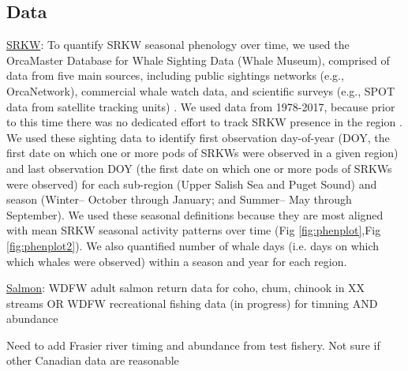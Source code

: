 \documentclass{article}
\begin{document}
\subsection* {Data}

\par \underline{SRKW}: To quantify SRKW seasonal phenology over time, we used the OrcaMaster Database for Whale Sighting Data (Whale Museum), comprised of data from five main sources, including public sightings networks (e.g., OrcaNetwork), commercial whale watch data, and scientific surveys (e.g., SPOT data from satellite tracking units) \citep{olson2018}. We used data from 1978-2017, because prior to this time there was no dedicated effort to track SRKW presence in the region \citep{olson2018}. We used these sighting data to identify first observation day-of-year (DOY, the first date on which one or more pods of SRKWs were observed in a given region) and last observation DOY (the first date on which one or more pods of SRKWs were observed) for each sub-region (Upper Salish Sea and Puget Sound) and season (Winter-- October through January; and Summer-- May through September). We used these seasonal definitions because they are most aligned with mean SRKW seasonal activity patterns over time (Fig \ref{fig:phenplot},Fig \ref{fig:phenplot2}). We also quantified number of whale days (i.e. days on which which whales were observed) within a season and year for each region. 


\par \underline{Salmon}:  WDFW adult salmon return data for coho, chum, chinook in XX streams OR WDFW recreational fishing data (in progress) for timning AND abundance
\par Need to add Frasier river timing and abundance from test fishery. Not sure if other Canadian data are reasonable
\end{document}
